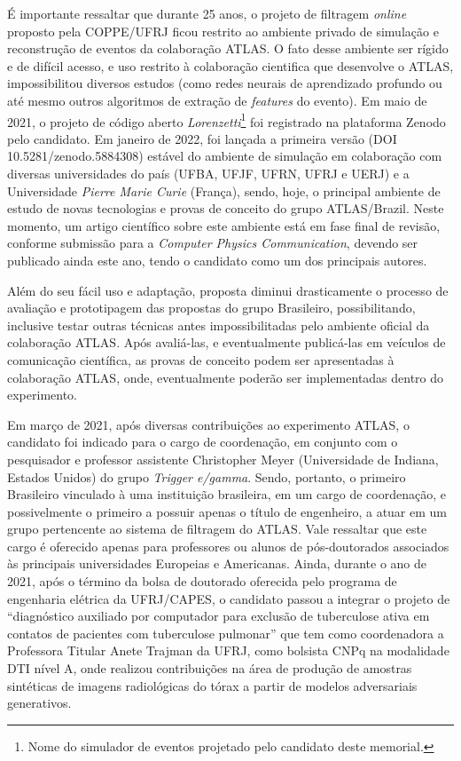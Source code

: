 É importante ressaltar que durante 25 anos, o projeto de filtragem \emph{online} proposto pela COPPE/UFRJ 
ficou restrito ao ambiente privado de simulação e reconstrução de eventos da colaboração ATLAS. 
O fato desse ambiente ser rígido e de difícil acesso, e uso restrito à colaboração cientifica que 
desenvolve o ATLAS, impossibilitou diversos estudos (como redes neurais de aprendizado profundo 
ou até mesmo outros algoritmos de extração de \emph{features} do evento). Em maio de 2021, o projeto de 
código aberto \emph{Lorenzetti}\footnote{Nome do simulador de eventos projetado pelo candidato deste memorial.} 
foi registrado na plataforma Zenodo pelo candidato. Em janeiro de 2022, foi lançada a primeira 
versão (DOI 10.5281/zenodo.5884308) estável do ambiente de simulação em colaboração com diversas 
universidades do país (UFBA, UFJF, UFRN, UFRJ e UERJ) e a Universidade \emph{Pierre Marie Curie} (França), 
sendo, hoje, o principal ambiente de estudo de novas tecnologias e provas de conceito do grupo ATLAS/Brazil. 
Neste momento, um artigo científico sobre este ambiente está em fase final de revisão, conforme submissão 
para a \emph{Computer Physics Communication}, devendo ser publicado ainda este ano, tendo o candidato 
como um dos principais autores.


Além do seu fácil uso e adaptação, proposta diminui drasticamente o processo de avaliação e prototipagem 
das propostas do grupo Brasileiro, possibilitando, inclusive testar outras técnicas antes impossibilitadas 
pelo ambiente oficial da colaboração ATLAS. Após avaliá-las, e eventualmente publicá-las em veículos de 
comunicação científica, as provas de conceito podem ser apresentadas à colaboração ATLAS, onde, eventualmente 
poderão ser implementadas dentro do experimento.


Em março de 2021, após diversas contribuições ao experimento ATLAS, o candidato foi indicado para o cargo de 
coordenação, em conjunto com o pesquisador e professor assistente Christopher Meyer (Universidade de 
Indiana, Estados Unidos) do grupo \emph{Trigger e/gamma}. Sendo, portanto, o primeiro Brasileiro vinculado à uma 
instituição brasileira, em um cargo 
de coordenação, e possivelmente o primeiro a possuir apenas o título de engenheiro, a atuar em um 
grupo pertencente ao sistema de filtragem do ATLAS. Vale ressaltar que este cargo é oferecido apenas para 
professores ou alunos de pós-doutorados associados às principais universidades Europeias e Americanas. 
Ainda, durante o ano de 2021, após o término da bolsa de doutorado oferecida pelo programa de engenharia 
elétrica da UFRJ/CAPES, o candidato passou a integrar o projeto de “diagnóstico auxiliado por computador 
para exclusão de tuberculose ativa em contatos de pacientes com tuberculose pulmonar” que tem como 
coordenadora a Professora Titular Anete Trajman da UFRJ, como bolsista CNPq na modalidade DTI nível A, onde 
realizou contribuições na área de produção de amostras sintéticas de imagens radiológicas do tórax a partir 
de modelos adversariais generativos.




